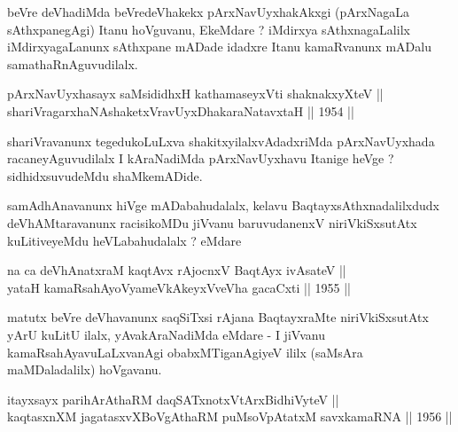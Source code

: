 \begin{artha}
beVre deVhadiMda beVredeVhakekx pArxNavUyxhakAkxgi
(pArxNagaLa sAthxpanegAgi) Itanu hoVguvanu, EkeMdare ? iMdirxya
sAthxnagaLalilx iMdirxyagaLanunx sAthxpane mADade idadxre Itanu
kamaRvanunx mADalu samathaRnAguvudilalx.
\end{artha}


\begin{shl}
pArxNavUyxhasayx saMsididhxH kathamaseyxVti shaknakxyXteV || \\
shariVragarxhaNAshaketxVravUyxDhakaraNatavxtaH \hfill || 1954 ||
  
\end{shl}

\begin{artha}
shariVravanunx tegedukoLuLxva shakitxyilalxvAdadxriMda
pArxNavUyxhada racaneyAguvudilalx I kAraNadiMda
pArxNavUyxhavu Itanige heVge ? sidhidxsuvudeMdu shaMkemADide.
\end{artha}

\begin{artha}
samAdhAnavanunx hiVge mADabahudalalx, kelavu BaqtayxsAthxnadalilxdudx
deVhAMtaravanunx racisikoMDu jiVvanu baruvudanenxV niriVkiSxsutAtx
kuLitiveyeMdu heVLabahudalalx ? eMdare
\end{artha}


\begin{shl}
na ca deVhAnatxraM kaqtAvx rAjocnxV BaqtAyx ivA\s \s sateV || \\
yataH kamaRsahAyoV\s yameVkAkeyxVveVha gacaCxti \hfill || 1955 ||
  
\end{shl}

\begin{artha}
matutx beVre deVhavanunx saqSiTxsi rAjana BaqtayxraMte niriVkiSxsutAtx
yArU kuLitU ilalx, yAvakAraNadiMda eMdare - I jiVvanu
kamaRsahAyavuLaLxvanAgi obabxMTiganAgiyeV ililx (saMsAra maMDaladalilx) hoVgavanu.
\end{artha}


\begin{shl}
itayxsayx parihArAthaRM daqSATxnotxV\s tArxBidhiVyteV ||  \\
kaqtasxnXM jagatasxvXBoVgAthaRM puMsoVpAtatxM savxkamaRNA \hfill || 1956 ||
  
\end{shl}

